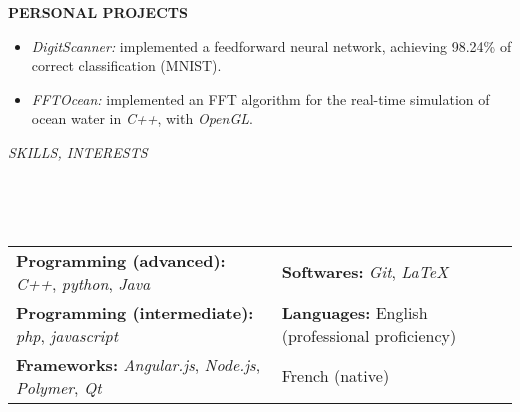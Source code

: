\documentclass[a4paper, 12pt]{article}
\newcommand{\marginline}{-0.3cm}
\newcommand{\margincontent}{-0.6cm}
\newcommand{\marginbeforesection}{0.3cm}
\newcommand{\marginbeforemisc}{-0.75cm}
\newcommand{\linewidthperso}{0.02cm}
\newcommand{\stylesection}[1]{
  \vspace{\marginbeforesection}
  \begin{normalsize}\textit{#1}\end{normalsize}
  \vspace{\marginline}\\
  \noindent\makebox[\linewidth]{\rule{\textwidth}{\linewidthperso}}

}
\newcommand{\styletitle}[1]{\textbf{#1}}
\begin{document}
\begin{footnotesize}
\styletitle{PERSONAL PROJECTS}\\
\vspace{\margincontent}
\begin{itemize}
  \item \textit{DigitScanner:} implemented a feedforward neural network, achieving 98.24\% of correct classification (MNIST).
  \item \textit{FFTOcean:} implemented an FFT algorithm for the real-time simulation of ocean water in \textit{C++}, with \textit{OpenGL}.
\end{itemize}

%

\stylesection{SKILLS, INTERESTS}
~\\
\vspace{\marginbeforemisc}

\noindent\begin{tabular}{@{}p{9cm}p{8cm}}
  \textbf{Programming (advanced):} \textit{C++}, \textit{python}, \textit{Java} & \textbf{Softwares:} \textit{Git}, \textit{LaTeX}\\
  \textbf{Programming (intermediate):} \textit{php}, \textit{javascript} & \textbf{Languages:} English (professional proficiency)\\
  \textbf{Frameworks:} \textit{Angular.js}, \textit{Node.js}, \textit{Polymer}, \textit{Qt} & \hspace{2cm} French (native)
\end{tabular}


\end{footnotesize}
\end{document}
